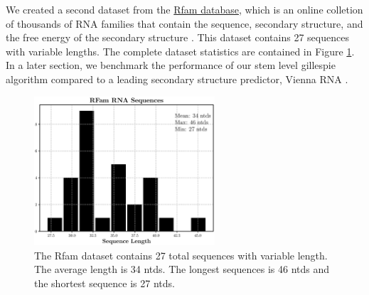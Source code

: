 \documentclass[11pt]{article}
\begin{document}
\begin{multicols}{2}
We created a second dataset from the \href{https://rfam.xfam.org}{Rfam database}, which is an online colletion of thousands of RNA families that contain the sequence, secondary structure, and the free energy of the secondary structure \cite{ 10.1093/nar/gkv480, doi:10.1002/cpbi.51}. This dataset contains 27 sequences with variable lengths. The complete dataset statistics are contained in Figure \ref{fig:rfam}. In a later section, we benchmark the performance of our stem level gillespie algorithm compared to a leading secondary structure predictor, Vienna RNA \cite{Lorenz2011}.

\begin{figure}[H]
\includegraphics[width = 0.6\textwidth]{fig/rfam}
\caption{The Rfam dataset contains 27 total sequences with variable length. The average length is 34 ntds. The longest sequences is 46 ntds and the shortest sequence is 27 ntds.}
\label{fig:rfam}
\end{figure}
\end{multicols}
\end{document}
